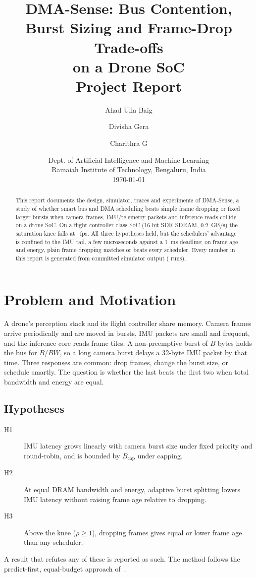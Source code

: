 \documentclass[11pt,a4paper]{article}
\title{DMA-Sense: Bus Contention, Burst Sizing and Frame-Drop Trade-offs\\on a Drone SoC\\[2pt]\large Project Report}
\author{Ahad Ulla Baig \and Divisha Gera \and Charithra G}
\date{Dept. of Artificial Intelligence and Machine Learning\\Ramaiah Institute of Technology, Bengaluru, India\\[6pt]\today}
\begin{document}
\maketitle
\begin{abstract}
\noindent This report documents the design, simulator, traces and experiments of DMA-Sense, a study of whether smart bus and DMA scheduling beats simple frame dropping or fixed larger bursts when camera frames, IMU/telemetry packets and inference reads collide on a drone SoC. On a flight-controller-class SoC (16-bit SDR SDRAM, 0.2~GB/s) the saturation knee falls at \kneeFps{}~fps. All three hypotheses held, but the schedulers' advantage is confined to the IMU tail, a few microseconds against a 1~ms deadline; on frame age and energy, plain frame dropping matches or beats every scheduler. Every number in this report is generated from committed simulator output (\nRuns{} runs).
\end{abstract}
\tableofcontents\newpage

\section{Problem and Motivation}
A drone's perception stack and its flight controller share memory. Camera frames arrive periodically and are moved in bursts, IMU packets are small and frequent, and the inference core reads frame tiles. A non-preemptive burst of $B$ bytes holds the bus for $B/BW$, so a long camera burst delays a 32-byte IMU packet by that time. Three responses are common: drop frames, change the burst size, or schedule smartly. The question is whether the last beats the first two when total bandwidth and energy are equal.

\subsection{Hypotheses}
\begin{description}
\item[H1] IMU \pone{} latency grows linearly with camera burst size under fixed priority and round-robin, and is bounded by $B_{\mathrm{cap}}$ under capping.
\item[H2] At equal DRAM bandwidth and energy, adaptive burst splitting lowers IMU \pone{} latency without raising frame age relative to dropping.
\item[H3] Above the knee ($\rho\ge1$), dropping frames gives equal or lower frame age than any scheduler.
\end{description}
A result that refutes any of these is reported as such. The method follows the predict-first, equal-budget approach of~\cite{baig2026fewer}.
\end{document}
